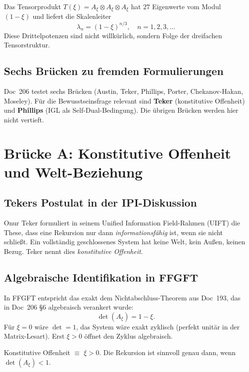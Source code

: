 Das Tensorprodukt $T(\xi) = A_\xi \otimes A_\xi \otimes A_\xi$ hat $27$ Eigenwerte vom Modul $(1-\xi)$ und liefert die Skalenleiter
\[
\lambda_n = (1-\xi)^{n/3}, \quad n = 1, 2, 3, \dots
\]
Diese Drittelpotenzen sind nicht willkürlich, sondern Folge der dreifachen Tensorstruktur.

\subsection{Sechs Brücken zu fremden Formulierungen}

Doc~206 testet sechs Brücken (Austin, Teker, Phillips, Porter, Chekanov-Hakan, Moseley). Für die Bewusstseinsfrage relevant sind \textbf{Teker} (konstitutive Offenheit) und \textbf{Phillips} (IGL als Self-Dual-Bedingung). Die übrigen Brücken werden hier nicht vertieft.

\section{Brücke A: Konstitutive Offenheit und Welt-Beziehung}\label{sec:brueckeA}

\subsection{Tekers Postulat in der IPI-Diskussion}

Onur Teker formuliert in seinem Unified Information Field-Rahmen (UIFT) die These, dass eine Rekursion nur dann \emph{informationsfähig} ist, wenn sie nicht schließt. Ein vollständig geschlossenes System hat keine Welt, kein Außen, keinen Bezug. Teker nennt dies \emph{konstitutive Offenheit}.

\subsection{Algebraische Identifikation in FFGFT}

In FFGFT entspricht das exakt dem Nichtabschluss-Theorem aus Doc~193, das in Doc~206 \S6 algebraisch verankert wurde:
\begin{equation}
\det(A_\xi) = 1 - \xi.
\end{equation}
Für $\xi = 0$ wäre $\det = 1$, das System wäre exakt zyklisch (perfekt unitär in der Matrix-Lesart). Erst $\xi > 0$ öffnet den Zyklus algebraisch.

\begin{insightBox}
Konstitutive Offenheit $\equiv$ $\xi > 0$. Die Rekursion ist sinnvoll genau dann, wenn $\det(A_\xi) < 1$.
\end{insightBox}

